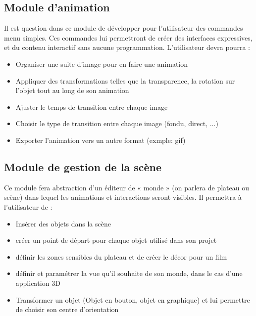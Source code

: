 \documentclass{ultimaade-fr}
\begin{document}
\subsection{Module d’animation}
Il est question dans ce module de développer pour l’utilisateur des commandes menu simples. Ces commandes lui permettront de créer des interfaces expressives, et du contenu interactif sans aucune programmation. L'utilisateur devra pourra :
\begin{itemize}
\item Organiser une suite d'image pour en faire une animation
\item Appliquer des transformations telles que la transparence, la rotation sur l'objet tout au long de son animation
\item Ajuster le temps de transition entre chaque image
\item Choisir le type de transition entre chaque image (fondu, direct, ...)
\item Exporter l'animation vers un autre format (exmple: gif)
\end{itemize}

\subsection{Module de gestion de la scène}
Ce module fera abstraction d’un éditeur de « monde » (on parlera de plateau ou scène)
dans lequel les animations et interactions seront visibles. Il permettra à l’utilisateur de :
\begin{itemize}
\item Insérer des objets dans la scène
\item créer un point de départ pour chaque objet utilisé dans son projet
\item définir les zones sensibles du plateau et de créer le décor pour un film
\item définir  et  paramétrer  la  vue  qu’il  souhaite  de  son  monde,  dans  le  cas  d’une application 3D
\item Transformer un objet (Objet en bouton, objet en graphique) et lui permettre de choisir son centre d’orientation
\end{itemize}
\end{document}

